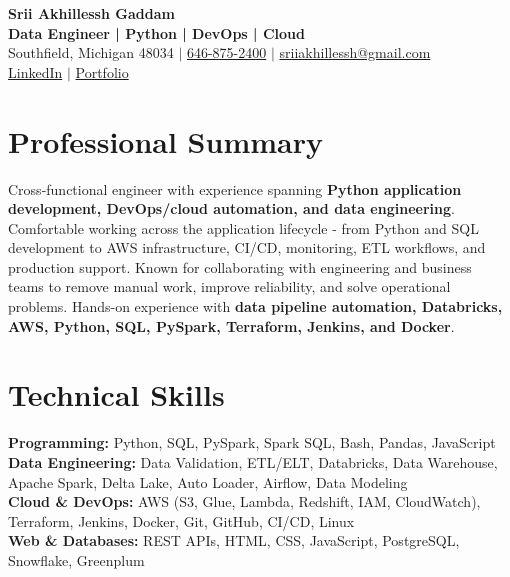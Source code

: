 \documentclass[letterpaper,10pt]{article}
\begin{document}
\fontsize{9.35pt}{10.45pt}\selectfont

\begin{center}
    {\LARGE \textbf{Srii Akhillessh Gaddam}} \\[-1pt]
    \textbf{Data Engineer | Python | DevOps | Cloud} \\[2pt]
    Southfield, Michigan 48034 $|$
    \href{tel:6468752400}{646-875-2400} $|$
    \href{mailto:sriiakhillessh@gmail.com}{sriiakhillessh@gmail.com} \\[1pt]
    \href{https://www.linkedin.com/in/srii-akhiilessh-gaddam-b48668191/}{LinkedIn} $|$
    \href{https://sriiakhillesshg.github.io/portfolio/}{Portfolio}
\end{center}
\vspace{-8pt}

\section{Professional Summary}
\small{Cross-functional engineer with experience spanning \textbf{Python application development, DevOps/cloud automation, and data engineering}. Comfortable working across the application lifecycle - from Python and SQL development to AWS infrastructure, CI/CD, monitoring, ETL workflows, and production support. Known for collaborating with engineering and business teams to remove manual work, improve reliability, and solve operational problems. Hands-on experience with \textbf{data pipeline automation, Databricks, AWS, Python, SQL, PySpark, Terraform, Jenkins, and Docker}.}

\section{Technical Skills}
\small{
\textbf{Programming:} Python, SQL, PySpark, Spark SQL, Bash, Pandas, JavaScript \\
\textbf{Data Engineering:} Data Validation, ETL/ELT, Databricks, Data Warehouse, Apache Spark, Delta Lake, Auto Loader, Airflow, Data Modeling \\
\textbf{Cloud \& DevOps:} AWS (S3, Glue, Lambda, Redshift, IAM, CloudWatch), Terraform, Jenkins, Docker, Git, GitHub, CI/CD, Linux \\
\textbf{Web \& Databases:} REST APIs, HTML, CSS, JavaScript, PostgreSQL, Snowflake, Greenplum
}
\end{document}
